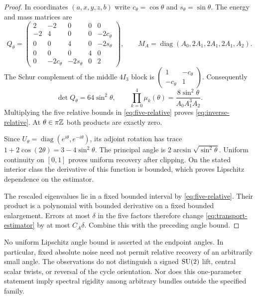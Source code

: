 \begin{proof}
In coordinates $(a,x,y,z,b)$ write $c_\theta=\cos\theta$ and
$s_\theta=\sin\theta$. The energy and mass matrices are
\begin{equation}\label{eq:five-matrices}
 Q_\theta=\begin{pmatrix}
 2&-2&0&0&0\\
 -2&4&0&0&-2c_\theta\\
 0&0&4&0&-2s_\theta\\
 0&0&0&4&0\\
 0&-2c_\theta&-2s_\theta&0&2
 \end{pmatrix},\qquad
 M_A=\operatorname{diag}(A_0,2A_1,2A_1,2A_1,A_2).
\end{equation}
The Schur complement of the middle $4I_3$ block is
$\left(\begin{smallmatrix}1&-c_\theta\\-c_\theta&1\end{smallmatrix}\right)$.
Consequently
\begin{equation}\label{eq:determinant-product}
 \det Q_\theta=64\sin^2\theta,\qquad
 \prod_{k=0}^4\mu_k(\theta)
       =\frac{8\sin^2\theta}{A_0A_1^3A_2}.
\end{equation}
Multiplying the five relative bounds in
\eqref{eq:five-relative} proves \eqref{eq:inverse-relative}.
At $\theta\in\pi\mathbb Z$ both products are exactly zero.

Since $U_\theta=\operatorname{diag}(e^{i\theta},e^{-i\theta})$,
its adjoint rotation has trace
$1+2\cos(2\theta)=3-4\sin^2\theta$. The principal angle is
$2\arcsin\sqrt{\sin^2\theta}$. Uniform continuity on $[0,1]$
proves uniform recovery after clipping. On the stated interior class
the derivative of this function is bounded, which proves Lipschitz
dependence on the estimator.

The rescaled eigenvalues lie in a fixed bounded interval by
\eqref{eq:five-relative}. Their product is a polynomial with bounded
derivative on a fixed bounded enlargement. Errors at most $\delta$
in the five factors therefore change \eqref{eq:transport-estimator}
by at most $C_A\delta$. Combine this with the preceding angle bound.
\end{proof}

No uniform Lipschitz angle bound is asserted at the endpoint angles.
In particular, fixed absolute noise need not permit relative recovery
of an arbitrarily small angle. The observations do not distinguish a
signed $\operatorname{SU}(2)$ lift, central scalar twists, or reversal of the cycle
orientation. Nor does this one-parameter statement imply spectral
rigidity among arbitrary bundles outside the specified family.

